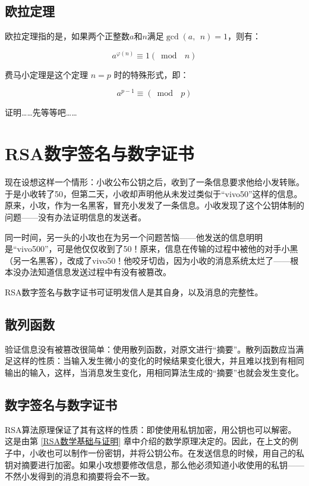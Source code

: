\documentclass[a4paper]{article}         %
\begin{document}
\subsection{欧拉定理}

欧拉定理指的是，如果两个正整数$a$和$n$满足$\gcd(a, \phantom{;} n) = 1$，则有：

\[
	a^{\varphi(n)} \equiv 1 (\bmod \phantom{;} n)
\]

费马小定理是这个定理 $n = p$ 时的特殊形式，即：

\[
	a ^ {p-1} \equiv (\bmod \phantom{;} p)
\]

证明……先等等吧……

\section{RSA数字签名与数字证书}

现在设想这样一个情形：小收公布公钥之后，收到了一条信息要求他给小发转账。于是小收转了50，但第二天，小收却声明他从未发过类似于“vivo50”这样的信息。原来，小攻，作为一名黑客，冒充小发发了一条信息。小收发现了这个公钥体制的问题——没有办法证明信息的发送者。

同一时间，另一头的小攻也在为另一个问题苦恼——他发送的信息明明是“vivo500”，可是他仅仅收到了50！原来，信息在传输的过程中被他的对手小黑（另一名黑客），改成了vivo50！他咬牙切齿，因为小收的消息系统太烂了——根本没办法知道信息发送过程中有没有被篡改。

RSA数字签名与数字证书可证明发信人是其自身，以及消息的完整性。

\subsection{散列函数} \label{散列函数}

验证信息没有被篡改很简单：使用散列函数，对原文进行“摘要”。散列函数应当满足这样的性质：当输入发生微小的变化的时候结果变化很大，并且难以找到有相同输出的输入，这样，当消息发生变化，用相同算法生成的“摘要”也就会发生变化。

\subsection{数字签名与数字证书}

RSA算法原理保证了其有这样的性质：即使使用私钥加密，用公钥也可以解密。这是由第 \ref{RSA数学基础与证明} 章中介绍的数学原理决定的。因此，在上文的例子中，小收也可以制作一份密钥，并将公钥公布。在发送信息的时候，用自己的私钥对摘要进行加密。如果小攻想要修改信息，那么他必须知道小收使用的私钥——不然小发得到的消息和摘要将会不一致。
\end{document}
